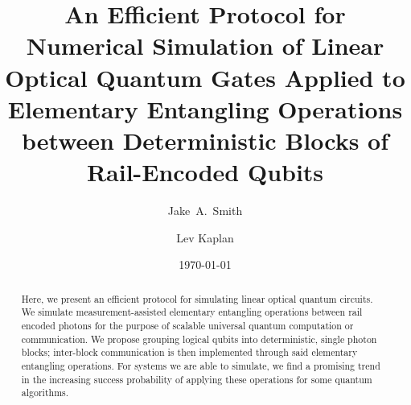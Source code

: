 \documentclass[aps,pra,twocolumn,showpacs,superscriptaddress,floatfix,10pt]{revtex4}
\begin{document}
\newcommand{\beq}{\begin{equation}}
\newcommand{\eeq}{\end{equation}}
\newcommand{\ben}{\begin{eqnarray}}
\newcommand{\een}{\end{eqnarray}}
\newcommand{\bea}{\begin{array}}
\newcommand{\eea}{\end{array}}
\newcommand{\om}{(\omega )}
\newcommand{\bef}{\begin{figure}}
\newcommand{\eef}{\end{figure}}
\newcommand{\leg}[1]{\caption{\protect\rm{\protect\footnotesize{#1}}}}
\newcommand{\ew}[1]{\langle{#1}\rangle}
\newcommand{\be}[1]{\mid\!{#1}\!\mid}
\newcommand{\no}{\nonumber}
\newcommand{\etal}{{\em et~al }}
\newcommand{\geff}{g_{\mbox{\it{\scriptsize{eff}}}}}
\newcommand{\da}[1]{{#1}^\dagger}
\newcommand{\cf}{{\it cf.\/}\ }
\newcommand{\ie}{{\it i.e.\/}\ }   

\newcommand{\spazio}{\vspace{0.3cm}}%
\newcommand{\de}[1]{\frac{\partial}{\partial{#1}}}
\newcommand{\U}{\tilde{U}}
\newcommand{\V}{\tilde{V}}


\title{An Efficient Protocol for Numerical Simulation of Linear Optical Quantum Gates Applied to Elementary Entangling Operations between Deterministic Blocks of Rail-Encoded Qubits}

\author{Jake~A.~Smith}

\author{Lev Kaplan}

 \begin{abstract}
Here, we present an efficient protocol for simulating linear optical quantum circuits. We simulate measurement-assisted elementary entangling operations between rail encoded photons for the purpose of scalable universal quantum computation or communication. We propose grouping logical qubits into deterministic, single photon blocks; inter-block communication is then implemented through said elementary entangling operations. For systems we are able to simulate, we find a promising trend in the increasing success probability of applying these operations for some quantum algorithms.
\end{abstract}                                                               
\date{\today}
\pacs{***}
\maketitle
\end{document}
